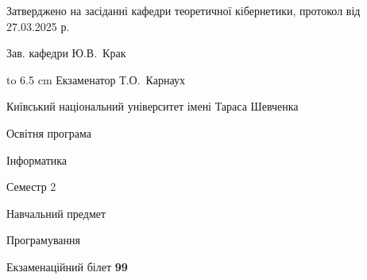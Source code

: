 \documentclass[12pt, ukrainian]{article}
\begin{document}
{\smallskip\smallskip \begin {scriptsize} Затверджено на засіданні кафедри теоретичної кібернетики, протокол   від   27.03.2025 р.\par\smallskip\smallskip\smallskip\smallskip
{\parbox {6.5 cm} {Зав. кафедри \dotfill Ю.В.~Крак}}\hspace {0.7cm} {\hbox to 6.5 cm { Екзаменатор \dotfill Т.О.~Карнаух}} \end{scriptsize}}
\newpage
{{\begin {scriptsize}\par
{ \center  Київський національний університет імені Тараса Шевченка \par}
{\parbox {5 cm}{Освітня програма \hfill}{\parbox {7 cm}{Інформатика\hfill}}\parbox {6 cm}{\hfill Семестр 2}}\par
{\parbox {5 cm} {Навчальний предмет \hfill}\parbox {7 cm}{Програмування \hfill}\parbox {6cm}{\hfill}\par}\vspace{-15pt} \end{scriptsize}}{\center Екзаменаційний білет \No \textbf { 99 }\par}}
\end{document}
